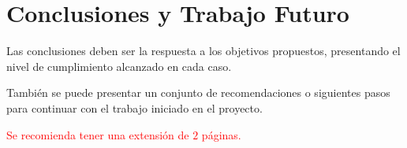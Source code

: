 \chapter{Conclusiones y Trabajo Futuro}\label{concl}

Las conclusiones deben ser la respuesta a los objetivos propuestos, presentando el nivel de cumplimiento alcanzado en cada caso. 

También se puede presentar un conjunto de recomendaciones o siguientes pasos para continuar con el trabajo iniciado en el proyecto.

\textcolor{red}{Se recomienda tener una extensión de $2$ páginas.}
